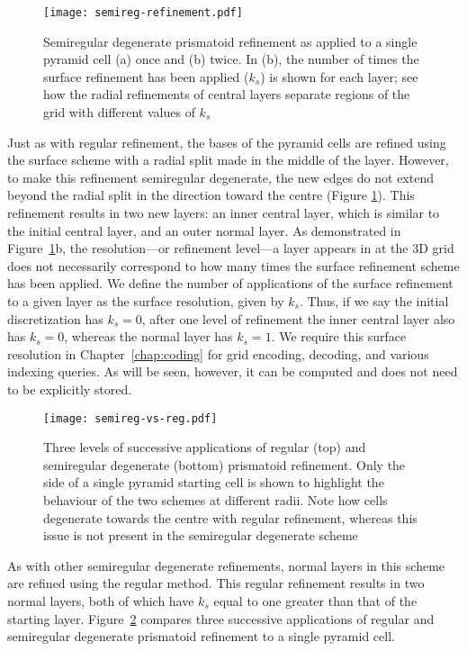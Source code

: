 \begin{figure}[ht!]
	\centering
	\texttt{[image: semireg-refinement.pdf]}
	\caption[Semiregular degenerate prismatoid refinement]{
		Semiregular degenerate prismatoid refinement as applied to a single pyramid cell (a) once and (b) twice.
		In (b), the number of times the surface refinement has been applied ($k_s$) is shown for each layer; see how the radial refinements of central layers separate regions of the grid with different values of $k_s$}
	\label{fig:semiregular}
\end{figure}


Just as with regular refinement, the bases of the pyramid cells are refined using the surface scheme with a radial split made in the middle of the layer.
However, to make this refinement semiregular degenerate, the new edges do not extend beyond the radial split in the direction toward the centre (Figure \ref{fig:semiregular}).
This refinement results in two new layers: an inner central layer, which is similar to the initial central layer, and an outer normal layer.
As demonstrated in Figure~\ref{fig:semiregular}b, the resolution---or refinement level---a layer appears in at the 3D grid does not necessarily correspond to how many times the surface refinement scheme has been applied.
We define the number of applications of the surface refinement to a given layer as the surface resolution, given by $k_s$.
Thus, if we say the initial discretization has $k_s = 0$, after one level of refinement the inner central layer also has $k_s = 0$, whereas the normal layer has $k_s = 1$.
We require this surface resolution in Chapter~\ref{chap:coding} for grid encoding, decoding, and various indexing queries. As will be seen, however, it can be computed and does not need to be explicitly stored.


\begin{figure}[ht!]
	\centering
	\texttt{[image: semireg-vs-reg.pdf]}
	\caption[Comparison of regular and semiregular degenerate prismatoid refinement]{
		Three levels of successive applications of regular (top) and semiregular degenerate (bottom) prismatoid refinement.
		Only the side of a single pyramid starting cell is shown to highlight the behaviour of the two schemes at different radii.
		Note how cells degenerate towards the centre with regular refinement, whereas this issue is not present in the semiregular degenerate scheme
	}
	\label{fig:semireg-vs-reg}
\end{figure}


As with other semiregular degenerate refinements, normal layers in this scheme are refined using the regular method.
This regular refinement results in two normal layers, both of which have $k_s$ equal to one greater than that of the starting layer.
Figure~\ref{fig:semireg-vs-reg} compares three successive applications of regular and semiregular degenerate prismatoid refinement to a single pyramid cell.


